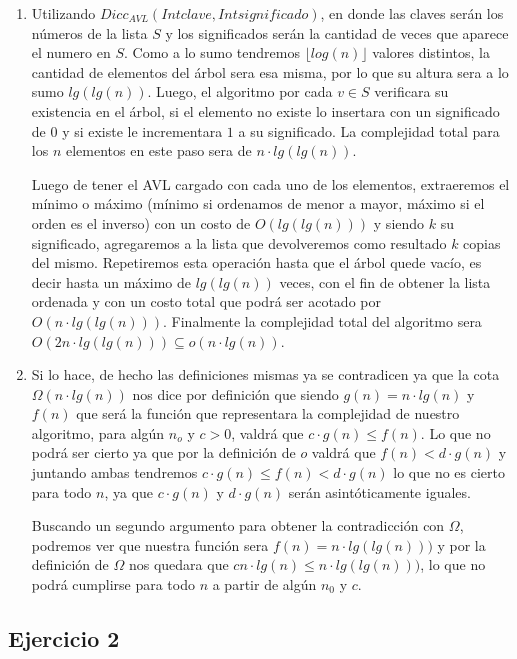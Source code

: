 \documentclass[10pt, a4paper]{article}
\begin{document}
\begin{enumerate}
 \item Utilizando $Dicc_{AVL}(Int clave, Int significado)$, en donde las claves ser\'an los n\'umeros de la lista $S$ y los significados ser\'an la cantidad de veces que aparece el numero en $S$. Como a lo sumo tendremos $\lfloor log(n) \rfloor$ valores distintos, la cantidad de elementos del \'arbol sera esa misma, por lo que su altura sera a lo sumo $lg(lg(n))$. Luego, el algoritmo por cada $v \in S$ verificara su existencia en el \'arbol, si el elemento no existe lo insertara con un significado de $0$ y si existe le incrementara $1$ a su significado. La complejidad total para los $n$ elementos en este paso sera de $n \cdot lg(lg(n))$. 
 
 Luego de tener el AVL cargado con cada uno de los elementos, extraeremos el m\'inimo o m\'aximo (m\'inimo si ordenamos de menor a mayor, m\'aximo si el orden es el inverso) con un costo de $O(lg(lg(n)))$ y siendo $k$ su significado, agregaremos a la lista que devolveremos como resultado $k$ copias del mismo. Repetiremos esta operaci\'on hasta que el \'arbol quede vac\'io, es decir hasta un m\'aximo de $lg(lg(n))$ veces, con el fin de obtener la lista ordenada y con un costo total que podr\'a ser acotado por $O(n \cdot lg(lg(n)))$. Finalmente la complejidad total del algoritmo sera $O(2n \cdot lg(lg(n))) \subseteq o(n\cdot lg(n))$.
 
 \item Si lo hace, de hecho las definiciones mismas ya se contradicen ya que la cota $\Omega(n\cdot lg(n))$ nos dice por definici\'on que siendo $g(n) = n\cdot lg(n)$ y $f(n)$ que ser\'a la funci\'on que representara la complejidad de nuestro algoritmo, para alg\'un $n_o$ y $c>0$, valdr\'a que $c\cdot g(n) \leq f(n)$. Lo que no podr\'a ser cierto ya que por la definici\'on de $o$ valdr\'a que $f(n) < d\cdot g(n)$ y juntando ambas tendremos $c\cdot g(n) \leq f(n) < d\cdot g(n)$ lo que no es cierto para todo $n$, ya que $c\cdot g(n)$ y $d\cdot g(n)$ ser\'an asint\'oticamente iguales.
 
 Buscando un segundo argumento para obtener la contradicci\'on con $\Omega$, podremos ver que nuestra funci\'on sera $f(n) = n \cdot lg(lg(n)))$ y por la definici\'on de $\Omega$ nos quedara que $cn\cdot lg(n) \leq n \cdot lg(lg(n)))$, lo que no podr\'a cumplirse para todo $n$ a partir de alg\'un $n_0$ y $c$.
 
 
\end{enumerate}


\subsection*{Ejercicio 2}
\end{document}
